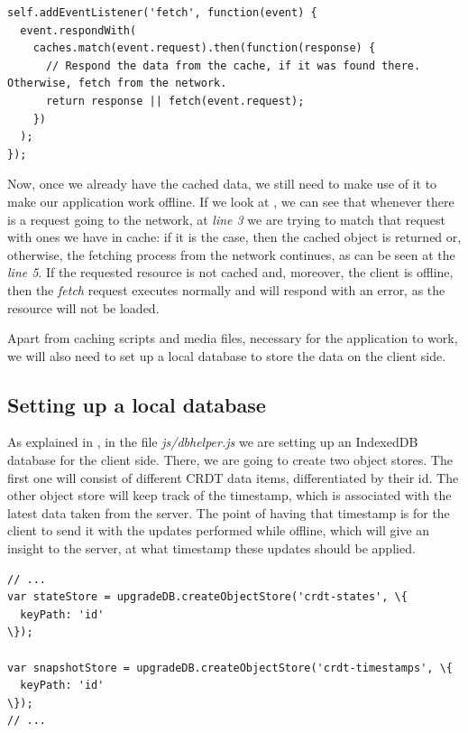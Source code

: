 \begin{lstlisting}[caption={Code for maintaining the requests of the application.}, label={lst:dev5}]
self.addEventListener('fetch', function(event) {
  event.respondWith(
    caches.match(event.request).then(function(response) {
      // Respond the data from the cache, if it was found there. Otherwise, fetch from the network.
      return response || fetch(event.request);
    })
  );
});
\end{lstlisting}

Now, once we already have the cached data, we still need to make use of it to make our application work offline. If we look at , we can see that whenever there is a request going to the network, at \textit{line 3} we are trying to match that request with ones we have in cache: if it is the case, then the cached object is returned or, otherwise, the fetching process from the network continues, as can be seen at the \textit{line 5}. If the requested resource is not cached and, moreover, the client is offline, then the \textit{fetch} request executes normally and will respond with an error, as the resource will not be loaded.

Apart from caching scripts and media files, necessary for the application to work, we will also need to set up a local database to store the data on the client side.

\subsection*{Setting up a local database}

As explained in , in the file \textit{js/dbhelper.js} we are setting up an IndexedDB database for the client side. There, we are going to create two object stores. The first one will consist of different CRDT data items, differentiated by their id. The other object store will keep track of the timestamp, which is associated with the latest data taken from the server. The point of having that timestamp is for the client to send it with the updates performed while offline, which will give an insight to the server, at what timestamp these updates should be applied.

\begin{lstlisting}[caption={[Creating object stores in IndexedDB]Creating object stores in IndexedDB for CRDTs and timestamps.}, label={lst:dev6}]
// ...
var stateStore = upgradeDB.createObjectStore('crdt-states', \{
  keyPath: 'id'
\});

var snapshotStore = upgradeDB.createObjectStore('crdt-timestamps', \{
  keyPath: 'id'
\});
// ...
\end{lstlisting}


